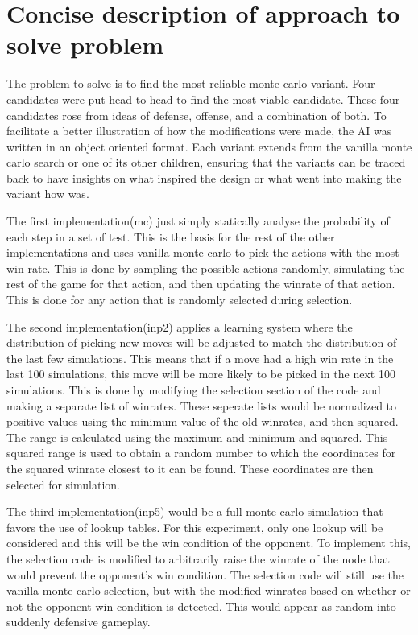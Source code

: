 \documentclass[12pt]{article}
\begin{document}
\section{Concise description of approach to solve problem}
The problem to solve is to find the most reliable monte carlo variant. Four candidates were put head to head to find the most viable candidate. These four candidates rose from ideas of defense, offense, and a combination of both. To facilitate a better illustration of how the modifications were made, the AI was written in an object oriented format. Each variant extends from the vanilla monte carlo search or one of its other children, ensuring that the variants can be traced back to have insights on what inspired the design or what went into making the variant how was. 
	
The first implementation(mc) just simply statically analyse the probability of each step in a set of test. This is the basis for the rest of the other implementations and uses vanilla monte carlo to pick the actions with the most win rate. This is done by sampling the possible actions randomly, simulating the rest of the game for that action, and then updating the winrate of that action. This is done for any action that is randomly selected during selection.

The second implementation(inp2) applies a learning system where the distribution of picking new moves will be adjusted to match the distribution of the last few simulations. This means that if a move had a high win rate in the last 100 simulations, this move will be more likely to be picked in the next 100 simulations. This is done by modifying the selection section of the code and making a separate list of winrates. These seperate lists would be normalized to positive values using the minimum value of the old winrates, and then squared. The range is calculated using the maximum and minimum and squared. This squared range is used to obtain a random number to which the coordinates for the squared winrate closest to it can be found. These coordinates are then selected for simulation.

The third implementation(inp5) would be a full monte carlo simulation that favors the use of lookup tables. For this experiment, only one lookup will be considered and this will be the win condition of the opponent. To implement this, the selection code is modified to arbitrarily raise the winrate of the node that would prevent the opponent’s win condition. The selection code will still use the vanilla monte carlo selection, but with the modified winrates based on whether or not the opponent win condition is detected. This would appear as random into suddenly defensive gameplay.
\end{document}
